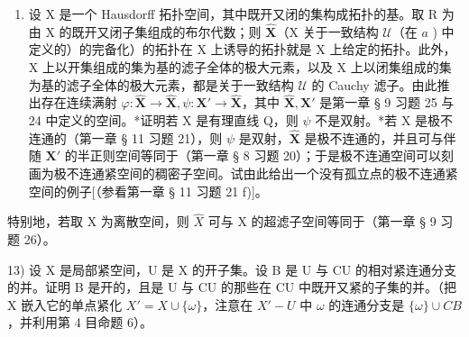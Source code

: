 \begin{enumerate}
\def\labelenumi{\alph{enumi})}
\setcounter{enumi}{1}
\tightlist
\item
  设 X 是一个 Hausdorff 拓扑空间，其中既开又闭的集构成拓扑的基。取 R 为由 X 的既开又闭子集组成的布尔代数；则 \(\hat{\mathbf{X}}\)（X 关于一致结构 \(\mathcal{U}\)（在 \(a\) ) 中定义的）的完备化）的拓扑在 X 上诱导的拓扑就是 X 上给定的拓扑。此外，X 上以开集组成的集为基的滤子全体的极大元素，以及 X 上以闭集组成的集为基的滤子全体的极大元素，都是关于一致结构 \(\mathcal{U}\) 的 Cauchy 滤子。由此推出存在连续满射 \(\varphi: \hat{\mathbf{X}} \to \hat{\mathbf{X}}, \psi: \mathbf{X}' \to \hat{\mathbf{X}}\)，其中 \(\hat{\mathbf{X}}, \mathbf{X}'\) 是第一章 § 9 习题 25 与 24 中定义的空间。*证明若 X 是有理直线 Q，则 \(\psi\) 不是双射。*若 X 是极不连通的（第一章 § 11 习题 21），则 \(\psi\) 是双射，\(\hat{\mathbf{X}}\) 是极不连通的，并且可与伴随 \(\mathbf{X}'\) 的半正则空间等同于（第一章 § 8 习题 20）；于是极不连通空间可以刻画为极不连通紧空间的稠密子空间。试由此给出一个没有孤立点的极不连通紧空间的例子{[}（参看第一章 § 11 习题 21 f){]}。
\end{enumerate}

特别地，若取 X 为离散空间，则 \(\hat{X}\) 可与 X 的超滤子空间等同于（第一章 § 9 习题 26）。

13) 设 X 是局部紧空间，U 是 X 的开子集。设 B 是 U 与 CU 的相对紧连通分支的并。证明 B 是开的，且是 U 与 CU 的那些在 CU 中既开又紧的子集的并。（把 X 嵌入它的单点紧化 \(X' = X \cup \{\omega\}\)，注意在 \(X' - U\) 中 \(\omega\) 的连通分支是 \(\{\omega\} \cup CB\)，并利用第 4 目命题 6）。

